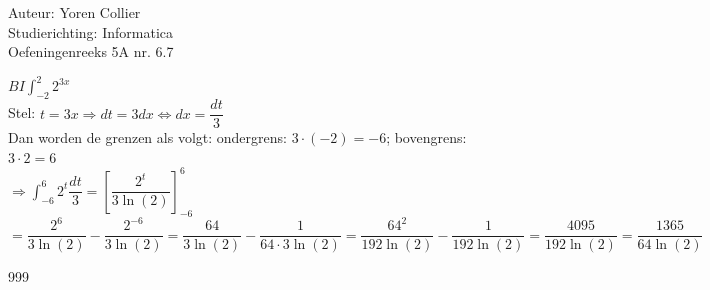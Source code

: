 \documentclass[a4paper]{article}
\newcommand{\asa}{\Leftrightarrow} %
\newcommand{\adR}{\Rightarrow} %
\newcommand{\Lh}{\left(} %
\newcommand{\Rh}{\right)}
\newcommand{\Lv}{\left[} %
\newcommand{\Rv}{\right]}
\newcommand{\intgrl}{\displaystyle\int} %
\begin{document}
\noindent \large Auteur: Yoren Collier \\
\noindent \large Studierichting: Informatica\\
\noindent \large Oefeningenreeks 5A nr. 6.7\\

\medskip

\normalsize

$ BI \intgrl_{-2}^2 2^{3x}$\\

Stel: $t = 3x \adR dt = 3dx \asa dx = \dfrac{dt}{3}$\\

Dan worden de grenzen als volgt: ondergrens: $3 \cdot \Lh -2 \Rh = -6$; bovengrens: $3 \cdot2 = 6$\\

$ \adR \intgrl_{-6}^6 2^t \dfrac{dt}{3} = \Lv \dfrac{2^t}{3\ln \Lh 2 \Rh} \Rv_{-6}^6 $\\

$= \dfrac{2^6}{3 \ln \Lh 2 \Rh} - \dfrac{2^{-6}}{3 \ln \Lh 2 \Rh} = \dfrac{64}{3 \ln \Lh 2 \Rh} - \dfrac{1}{64 \cdot 3 \ln \Lh 2 \Rh} = \dfrac{64^2}{192 \ln \Lh 2 \Rh} - \dfrac{1}{192 \ln \Lh 2 \Rh} = \dfrac{4095}{192 \ln \Lh 2 \Rh} = \dfrac{1365}{64 \ln \Lh 2 \Rh}$\\

\begin{thebibliography}{999}
\end{thebibliography}
\end{document}
